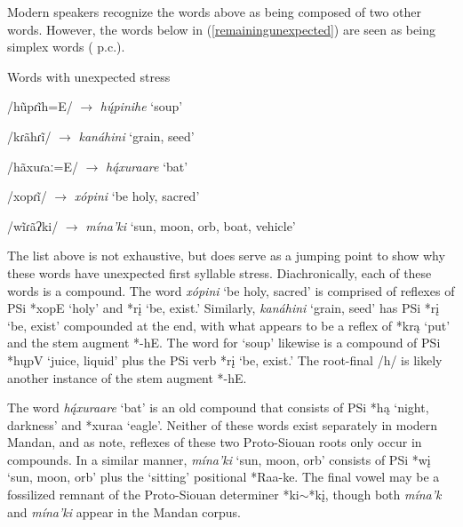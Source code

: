 Modern speakers recognize the words above as being composed of two other words. However, the words below in (\ref{remainingunexpected}) are seen as being simplex words (\citeauthor{benson2000} p.c.).

\begin{exe}
\item\label{remainingunexpected} Words with unexpected stress

\begin{xlist}
\item /hũpɾĩh=E/ $\to$ \textit{hų́pinihe} `soup'

\item /kɾãhɾĩ/ $\to$ \textit{kanáhini} `grain, seed'

\item /hãxuɾaː=E/ $\to$ \textit{hą́xuraare} `bat'

\item /xopɾĩ/ $\to$ \textit{xópini} `be holy, sacred'

\item /wĩɾãʔki/ $\to$ \textit{mína'ki} `sun, moon, orb, boat, vehicle'
\end{xlist}

\end{exe}

The list above is not exhaustive, but does serve as a jumping point to show why these words have unexpected first syllable stress. Diachronically, each of these words is a compound. The word \textit{xópini} `be holy, sacred' is comprised of reflexes of PSi *xopE `holy' and *rį `be, exist.' Similarly, \textit{kanáhini} `grain, seed' has PSi *rį `be, exist' compounded at the end, with what appears to be a reflex of *krą `put' and the stem augment *-hE. The word for `soup' likewise is a compound of PSi *hųpV `juice, liquid' plus the PSi verb *rį `be, exist.' The root-final /h/ is likely another instance of the stem augment *-hE.

The word \textit{hą́xuraare} `bat' is an old compound that consists of PSi *hą `night, darkness' and *xuraa `eagle'. Neither of these words exist separately in modern Mandan, and as \citet{rankin2015} note, reflexes of these two Proto-Siouan roots only occur in compounds. In a similar manner, \textit{mína'ki} `sun, moon, orb' consists of PSi *wį `sun, moon, orb' plus the `sitting' positional *Raa-ke. The final vowel may be a fossilized remnant of the Proto-Siouan determiner *ki$\sim$*kį, though both \textit{mína'k} and \textit{mína'ki} appear in the Mandan corpus.

